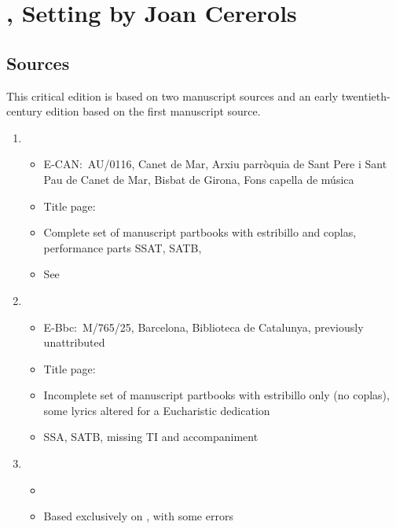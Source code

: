 
\section{%
, Setting by Joan Cererols
}

\subsection*{%
Sources
}

This critical edition is based on two manuscript sources and an early twentieth-century edition based on the first manuscript source.

\begin{enumerate}
\item{}
	\begin{itemize}
	\item{%
	E-CAN:~AU/0116, Canet de Mar, Arxiu parròquia de Sant Pere i Sant Pau de Canet de Mar, Bisbat de Girona, Fons capella de música
	} \item{%
	Title page: 
	} \item{%
	Complete set of manuscript partbooks with estribillo and coplas, performance parts SSAT, SATB, 
	} \item{%
	See 
	}
	\end{itemize}
%
\item{}
	\begin{itemize}
	\item{%
	E-Bbc:~M/765/25, Barcelona, Biblioteca de Catalunya, previously unattributed 
	} \item{%
	Title page: 
	} \item{%
	Incomplete set of manuscript partbooks with estribillo only (no coplas), some lyrics altered for a Eucharistic dedication
	} \item{%
	SSA, SATB, missing TI and accompaniment
	}
	\end{itemize}
%
\item{}
	\begin{itemize}
	\item{%
	} \item{%
	Based exclusively on , with some errors
	}
	\end{itemize}
\end{enumerate}

